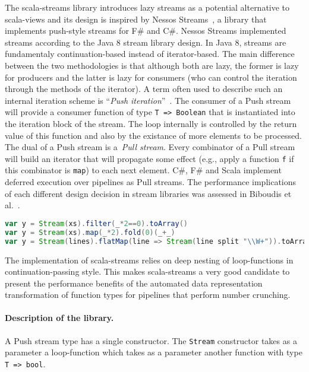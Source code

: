 The scala-streams library introduces lazy streams as a potential alternative to
scala-views and its design is inspired by Nessos Streams~\cite{nessos_streams},
a library that implements push-style streams for F\# and C\#. Nessos Streams
implemented streams according to the Java 8 stream library design. In Java 8,
streams are fundamentaly continuation-based instead of iterator-based. The main
difference between the two methodologies is that although both are lazy, the
former is lazy for producers and the latter is lazy for consumers (who can
control the iteration through the methods of the iterator). A term often used to
describe such an internal iteration scheme is ``\emph{Push
  iteration}''~\cite{obsidian,defuncpush}.  The consumer of a Push stream will
provide a consumer function of type \verb|T => Boolean| that is instantiated
into the iteration block of the stream. The loop internally is controlled by the
return value of this function and also by the existance of more elements to be
processed. The dual of a Push stream is a~\emph{Pull stream}. Every combinator
of a Pull stream will build an iterator that will propagate some effect (e.g.,
apply a function \verb|f| if this combinator is \verb|map|) to each next
element. C\#, F\# and Scala implement deferred execution over pipelines as Pull
streams. The performance implications of each different design decision in
stream libraries was assessed in Biboudis et al.~\cite{biboudis_clash_2014}.

\begin{lstlisting}[language=Scala, caption=Example uses of scala-streams.]
var y = Stream(xs).filter(_*2==0).toArray()
var y = Stream(xs).map(_*2).fold(0)(_+_)
var y = Stream(lines).flatMap(line => Stream(line split "\\W+")).toArray
\end{lstlisting}

The implementation of scala-streams relies on deep nesting of loop-functions in
continuation-passing style. This makes scala-streams a very good candidate to
present the performance benefits of the automated data representation
transformation of function types for pipelines that perform number crunching.

\paragraph{Description of the library. }
A Push stream type has a single constructor. The \verb|Stream| constructor takes
as a parameter a loop-function which takes as a parameter another function with
type \verb|T => bool|.

